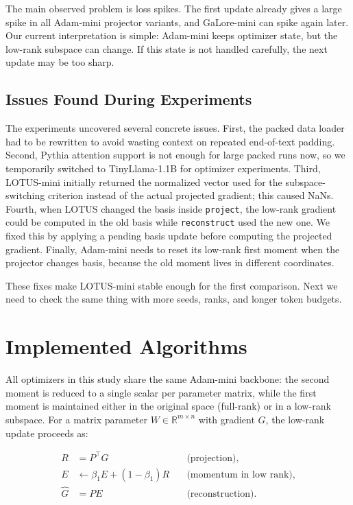 \documentclass[conference]{IEEEtran}
\begin{document}
The main observed problem is loss spikes. The first update already gives a large spike in all Adam-mini projector variants, and GaLore-mini can spike again later. Our current interpretation is simple: Adam-mini keeps optimizer state, but the low-rank subspace can change. If this state is not handled carefully, the next update may be too sharp.

\subsection{Issues Found During Experiments}

The experiments uncovered several concrete issues. First, the packed data loader had to be rewritten to avoid wasting context on repeated end-of-text padding. Second, Pythia attention support is not enough for large packed runs now, so we temporarily switched to TinyLlama-1.1B for optimizer experiments. Third, LOTUS-mini initially returned the normalized vector used for the subspace-switching criterion instead of the actual projected gradient; this caused NaNs. Fourth, when LOTUS changed the basis inside \texttt{project}, the low-rank gradient could be computed in the old basis while \texttt{reconstruct} used the new one. We fixed this by applying a pending basis update before computing the projected gradient. Finally, Adam-mini needs to reset its low-rank first moment when the projector changes basis, because the old moment lives in different coordinates.

These fixes make LOTUS-mini stable enough for the first comparison. Next we need to check the same thing with more seeds, ranks, and longer token budgets.


\section{Implemented Algorithms}
\label{sec:implemented-algorithms}

All optimizers in this study share the same Adam-mini backbone: the second moment is reduced to a single scalar per parameter matrix, while the first moment is maintained either in the original space (full-rank) or in a low-rank subspace. For a matrix parameter \(W\in\mathbb{R}^{m\times n}\) with gradient \(G\), the low-rank update proceeds as:

\[
\begin{aligned}
R &= P^\top G \quad &\text{(projection)}, \\
E &\leftarrow \beta_1 E + (1-\beta_1) R \quad &\text{(momentum in low rank)}, \\
\widehat{G} &= P E \quad &\text{(reconstruction)}.
\end{aligned}
\]
\end{document}
